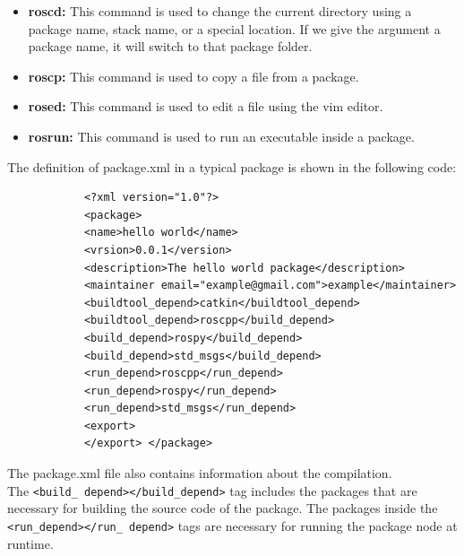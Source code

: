 \documentclass[../../main]{subfiles}
\begin{document}
\begin{itemize}
    \item
    \textbf{roscd:} This command is used to change the current directory using a
      package name, stack name, or a special location. If we give the
      argument a package name, it will switch to that package folder.
    \item
    \textbf{roscp:} This command is used to copy a file from a package.
    \item
    \textbf{rosed:} This command is used to edit a file using the vim editor.
    \item
    \textbf{rosrun:} This command is used to run an executable inside a package.
    \end{itemize}
    The definition of package.xml in a typical package is shown in the following
    code:
        
        \begin{verbatim}
            <?xml version="1.0"?>
            <package>
            <name>hello world</name>
            <vrsion>0.0.1</version>
            <description>The hello world package</description>
            <maintainer email="example@gmail.com">example</maintainer>
            <buildtool_depend>catkin</buildtool_depend>
            <buildtool_depend>roscpp</build_depend>
            <build_depend>rospy</build_depend>
            <build_depend>std_msgs</build_depend>
            <run_depend>roscpp</run_depend>
            <run_depend>rospy</run_depend>
            <run_depend>std_msgs</run_depend>
            <export>
            </export> </package>
        \end{verbatim}

        The package.xml file also contains information about the compilation.\\ The \texttt{<build\_
        depend></build\_depend>} tag includes the packages that are necessary for building
        the source code of the package. The packages inside the \texttt{<run\_depend></run\_
        depend>} tags are necessary for running the package node at runtime.
        \
\end{document}

